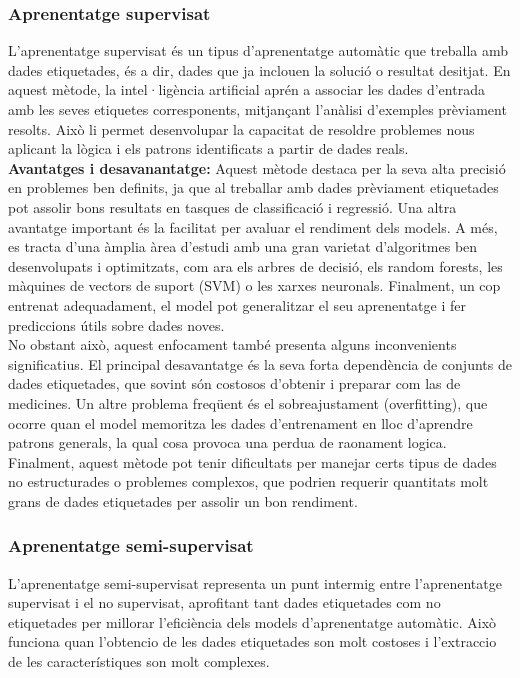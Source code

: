 \subsubsection{Aprenentatge supervisat}\label{subsubsec:Aprenentatge supervisat}
L'aprenentatge supervisat és un tipus d'aprenentatge automàtic que treballa amb dades etiquetades, és a dir, dades que ja inclouen la solució o resultat desitjat. En aquest mètode, la intel·ligència artificial aprén a associar les dades d'entrada amb les seves etiquetes corresponents, mitjançant l'anàlisi d'exemples prèviament resolts. Això li permet desenvolupar la capacitat de resoldre problemes nous aplicant la lògica i els patrons identificats a partir de dades reals. \\

\textbf{Avantatges i desavanantatge:}
Aquest mètode destaca per la seva alta precisió en problemes ben definits, ja que al treballar amb dades prèviament etiquetades pot assolir bons resultats en tasques de classificació i regressió. Una altra avantatge important és la facilitat per avaluar el rendiment dels models. A més, es tracta d'una àmplia àrea d'estudi amb una gran varietat d'algoritmes ben desenvolupats i optimitzats, com ara els arbres de decisió, els random forests, les màquines de vectors de suport (SVM) o les xarxes neuronals. Finalment, un cop entrenat adequadament, el model pot generalitzar el seu aprenentatge i fer prediccions útils sobre dades noves.\\

No obstant això, aquest enfocament també presenta alguns inconvenients significatius. El principal desavantatge és la seva forta dependència de conjunts de dades etiquetades, que sovint són costosos d'obtenir i preparar com las de medicines. Un altre problema freqüent és el sobreajustament (overfitting), que ocorre quan el model memoritza les dades d'entrenament en lloc d'aprendre patrons generals, la qual cosa provoca una perdua de raonament logica. Finalment, aquest mètode pot tenir dificultats per manejar certs tipus de dades no estructurades o problemes complexos, que podrien requerir quantitats molt grans de dades etiquetades per assolir un bon rendiment.


\subsubsection{Aprenentatge semi-supervisat}\label{subsubsec:Aprenentatge semi-supervisat}

L'aprenentatge semi-supervisat representa un punt intermig entre l'aprenentatge supervisat i el no supervisat, aprofitant tant dades etiquetades com no etiquetades per millorar l'eficiència dels models d'aprenentatge automàtic. Això funciona quan l'obtencio de les dades etiquetades son molt costoses i l'extraccio de les característiques son molt complexes.
